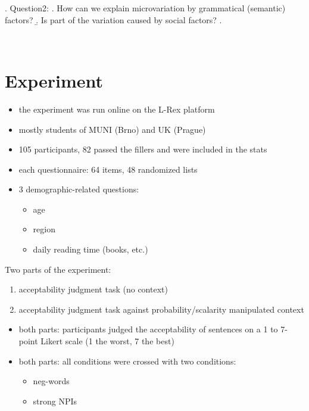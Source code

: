 \documentclass[
  letterpaper,
  DIV=11,
  numbers=noendperiod]{scrartcl}
\providecommand{\tightlist}{%
  \setlength{\itemsep}{0pt}\setlength{\parskip}{0pt}}\usepackage{longtable,booktabs,array}
\begin{document}
\ex. Question2: \a. How can we explain microvariation by grammatical
(semantic) factors? \b. Is part of the variation caused by social
factors? \z.

~

\hypertarget{experiment}{%
\section{Experiment}\label{experiment}}

\begin{itemize}
\tightlist
\item
  the experiment was run online on the L-Rex platform
\item
  mostly students of MUNI (Brno) and UK (Prague)
\item
  105 participants, 82 passed the fillers and were included in the stats
\item
  each questionnaire: 64 items, 48 randomized lists
\item
  3 demographic-related questions:

  \begin{itemize}
  \tightlist
  \item
    age
  \item
    region
  \item
    daily reading time (books, etc.)
  \end{itemize}
\end{itemize}

Two parts of the experiment:

\begin{enumerate}
\def\labelenumi{\arabic{enumi}.}
\item
  acceptability judgment task (no context)
\item
  acceptability judgment task against probability/scalarity manipulated
  context
\end{enumerate}

\begin{itemize}
\item
  both parts: participants judged the acceptability of sentences on a 1
  to 7-point Likert scale (1 the worst, 7 the best)
\item
  both parts: all conditions were crossed with two conditions:

  \begin{itemize}
  \tightlist
  \item
    neg-words
  \item
    strong NPIs
  \end{itemize}
\end{itemize}
\end{document}
